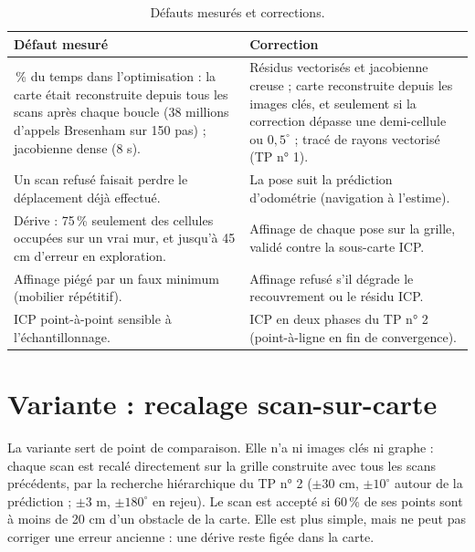 \documentclass[11pt,a4paper]{article}
\newcommand{\code}[1]{\texttt{\detokenize{#1}}}
\begin{document}
\begin{table}[htbp]
\centering
\caption{Défauts mesurés et corrections.}
\begin{tabularx}{\linewidth}{>{\raggedright\arraybackslash}X>{\raggedright\arraybackslash}X}
\toprule
Défaut mesuré & Correction \\
\midrule
78\,\% du temps dans l'optimisation : la carte était reconstruite depuis
tous les scans après chaque boucle (38 millions d'appels Bresenham sur
150 pas) ; jacobienne dense (8 s). &
Résidus vectorisés et jacobienne creuse ; carte reconstruite depuis les
images clés, et seulement si la correction dépasse une demi-cellule ou
$0{,}5^\circ$ ; tracé de rayons vectorisé (TP n° 1). \\
Un scan refusé faisait perdre le déplacement déjà effectué. &
La pose suit la prédiction d'odométrie (navigation à l'estime). \\
Dérive : 75\,\% seulement des cellules occupées sur un vrai mur, et
jusqu'à 45 cm d'erreur en exploration. &
Affinage de chaque pose sur la grille, validé contre la sous-carte ICP. \\
Affinage piégé par un faux minimum (mobilier répétitif). &
Affinage refusé s'il dégrade le recouvrement ou le résidu ICP. \\
ICP point-à-point sensible à l'échantillonnage. &
ICP en deux phases du TP n° 2 (point-à-ligne en fin de convergence). \\
\bottomrule
\end{tabularx}
\end{table}

\section{Variante : recalage scan-sur-carte}
La variante \code{slam_carte.py} sert de point de comparaison. Elle n'a ni
images clés ni graphe : chaque scan est recalé directement sur la grille
construite avec tous les scans précédents, par la recherche hiérarchique du
TP n° 2 ($\pm30$ cm, $\pm10^\circ$ autour de la prédiction ; $\pm3$ m,
$\pm180^\circ$ en rejeu). Le scan est accepté si 60\,\% de ses points sont
à moins de 20 cm d'un obstacle de la carte. Elle est plus simple, mais ne
peut pas corriger une erreur ancienne : une dérive reste figée dans la carte.
\end{document}
